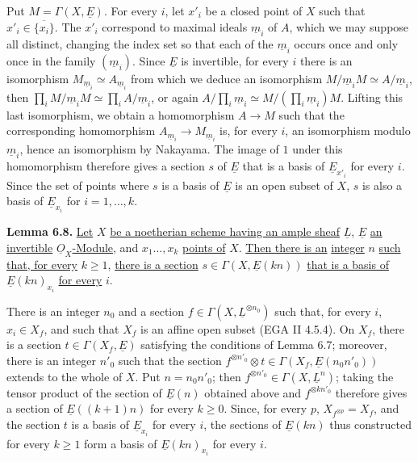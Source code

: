 Put $M=\Gamma(X,\underline{E})$. For every $i$, let $x'_i$ be a closed point of $X$ such that $x'_i\in\overline{\{x_i\}}$. The $x'_i$ correspond to maximal ideals $\underline{m}_i$ of $A$, which we may suppose all distinct, changing the index set so that each of the $\underline{m}_i$ occurs once and only once in the family $(\underline{m}_i)$. Since $\underline{E}$ is invertible, for every $i$ there is an isomorphism $M_{\underline{m}_i}\simeq A_{\underline{m}_i}$ from which we deduce an isomorphism $M/\underline{m}_iM\simeq A/\underline{m}_i$, then $\prod_i M/\underline{m}_iM\simeq\prod_i A/\underline{m}_i$, or again $A/\prod_i\underline{m}_i\simeq M/(\prod_i\underline{m}_i)M$. Lifting this last isomorphism, we obtain a homomorphism $A\to M$ such that the corresponding homomorphism $A_{\underline{m}_i}\to M_{\underline{m}_i}$ is, for every $i$, an isomorphism modulo $\underline{m}_i$, hence an isomorphism by Nakayama. The image of $1$ under this homomorphism therefore gives a section $s$ of $\underline{E}$ that is a basis of $\underline{E}_{x'_i}$ for every $i$. Since the set of points where $s$ is a basis of $\underline{E}$ is an open subset of $X$, $s$ is also a basis of $\underline{E}_{x_i}$ for $i=1,\ldots,k$.

\textbf{Lemma 6.8.} \uline{Let} $X$ \uline{be a noetherian scheme having an ample sheaf} $\underline{L}$, $\underline{E}$ \uline{an invertible} $\underline{O}_X$\uline{-Module}, and $x_1\ldots,x_k$ \uline{points of} $X$. \uline{Then there is an}
%
\uline{integer} $n$ \uline{such that, for every} $k\ge1$, \uline{there is a section} $s\in\Gamma(X,\underline{E}(kn))$ \uline{that is a basis of} $\underline{E}(kn)_{x_i}$ \uline{for every} $i$.

There is an integer $n_0$ and a section $f\in\Gamma(X,\underline{L}^{\otimes n_0})$ such that, for every $i$, $x_i\in X_f$, and such that $X_f$ is an affine open subset (EGA II 4.5.4). On $X_f$, there is a section $t\in\Gamma(X_f,\underline{E})$ satisfying the conditions of Lemma 6.7; moreover, there is an integer $n'_0$ such that the section $f^{\otimes n'_0}\otimes t\in\Gamma(X_f,\underline{E}(n_0n'_0))$ extends to the whole of $X$. Put $n=n_0n'_0$; then $f^{\otimes n'_0}\in\Gamma(X,\underline{L}^n)$; taking the tensor product of the section of $\underline{E}(n)$ obtained above and $f^{\otimes kn'_0}$ therefore gives a section of $\underline{E}((k+1)n)$ for every $k\ge0$. Since, for every $p$, $X_{f^{\otimes p}}=X_f$, and the section $t$ is a basis of $\underline{E}_{x_i}$ for every $i$, the sections of $\underline{E}(kn)$ thus constructed for every $k\ge1$ form a basis of $\underline{E}(kn)_{x_i}$ for every $i$.

